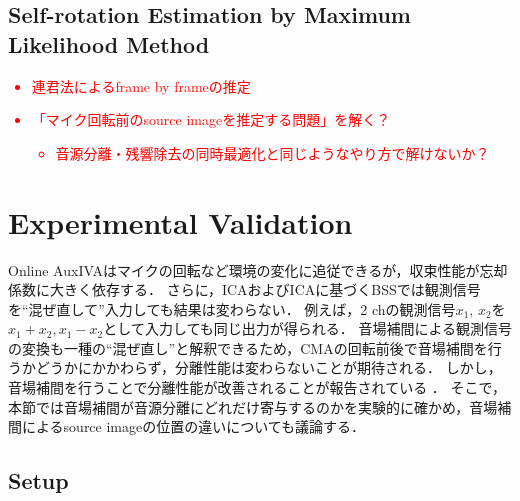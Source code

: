 \documentclass[sip,biber]{now-journal}
\newcommand{\todo}[1]{\textcolor{red}{#1}}
\begin{document}
\subsection{Self-rotation Estimation by Maximum Likelihood Method}

\todo{%
  \begin{itemize}
    \item 連君法によるframe by frameの推定
    \item 「マイク回転前のsource imageを推定する問題」を解く？
      \begin{itemize}
        \item 音源分離・残響除去の同時最適化と同じようなやり方で解けないか？
      \end{itemize}
  \end{itemize}
}

\section{Experimental Validation}\label{sec:experiment}

Online AuxIVAはマイクの回転など環境の変化に追従できるが，収束性能が忘却係数に大きく依存する．
さらに，ICAおよびICAに基づくBSSでは観測信号を``混ぜ直して''入力しても結果は変わらない．
例えば，2 chの観測信号$x_1,\, x_2$を$x_1+x_2, x_1-x_2$として入力しても同じ出力が得られる．
音場補間による観測信号の変換も一種の``混ぜ直し''と解釈できるため，CMAの回転前後で音場補間を行うかどうかにかかわらず，分離性能は変わらないことが期待される．
しかし，音場補間を行うことで分離性能が改善されることが報告されている \cite{Nakashima:2022:ASJ:A}．
そこで，本節では音場補間が音源分離にどれだけ寄与するのかを実験的に確かめ，音場補間によるsource imageの位置の違いについても議論する．

\subsection*{Setup}
\end{document}
